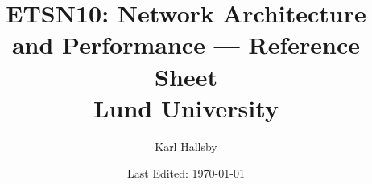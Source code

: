 


\graphicspath{{./Drawings/ETSN10-Network_Architecture_Performance}} %


\DeclareMathOperator{\Prob}{\operatorname{P}}
\DeclareMathOperator{\Given}{\vert}
\DeclareMathOperator{\ExpectedValue}{\operatorname{\mathbb{E}}}
\DeclareMathOperator{\Variance}{\operatorname{VAR}}
\DeclareMathOperator{\StdDev}{\operatorname{STD}}
\DeclareMathOperator{\Covariance}{\operatorname{Cov}}
\DeclareMathOperator{\CorrCoeff}{\rho}

\newcommand{\SetOrder}[1]{\lvert #1 \rvert}

\begin{titlepage}
  \title{ETSN10: Network Architecture and Performance --- Reference Sheet \\ Lund University}
  \author{Karl Hallsby}
  \date{Last Edited: \today} %
\end{titlepage}


\maketitle
{} %
\tableofcontents
\clearpage
\listoftheorems[ignoreall, show={definition, Definition}]
\clearpage
{} %







